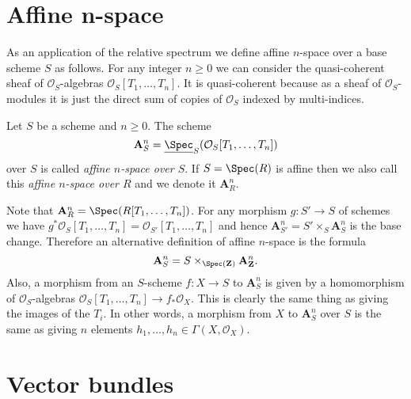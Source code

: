 \section{Affine n-space}
\label{section-affine-n-space}

\noindent
As an application of the relative spectrum
we define affine $n$-space over a base scheme
$S$ as follows. For any integer $n \geq 0$ we can consider the
quasi-coherent sheaf of $\mathcal{O}_S$-algebras
$\mathcal{O}_S[T_1, \ldots, T_n]$. It is quasi-coherent because
as a sheaf of $\mathcal{O}_S$-modules it is just the direct sum
of copies of $\mathcal{O}_S$ indexed by multi-indices.

\begin{definition}
\label{definition-affine-n-space}
Let $S$ be a scheme and $n \geq 0$.
The scheme
$$
\mathbf{A}^n_S =
\underline{\Spec}_S(\mathcal{O}_S[T_1, \ldots, T_n])
$$
over $S$ is called {\it affine $n$-space over $S$}.
If $S = \Spec(R)$ is affine then we also call this
{\it affine $n$-space over $R$} and we denote it $\mathbf{A}^n_R$.
\end{definition}

\noindent
Note that $\mathbf{A}^n_R = \Spec(R[T_1, \ldots, T_n])$.
For any morphism $g : S' \to S$ of schemes we have
$g^*\mathcal{O}_S[T_1, \ldots, T_n] = \mathcal{O}_{S'}[T_1, \ldots, T_n]$
and hence $\mathbf{A}^n_{S'} = S' \times_S \mathbf{A}^n_S$ is the base
change. Therefore an alternative definition of affine $n$-space
is the formula
$$
\mathbf{A}^n_S = S \times_{\Spec(\mathbf{Z})} \mathbf{A}^n_{\mathbf{Z}}.
$$
Also, a morphism from an $S$-scheme $f : X \to S$
to $\mathbf{A}^n_S$ is given by a homomorphism of
$\mathcal{O}_S$-algebras
$\mathcal{O}_S[T_1, \ldots, T_n] \to f_*\mathcal{O}_X$.
This is clearly the same thing as giving the images of the $T_i$.
In other words, a morphism from $X$ to $\mathbf{A}^n_S$ over $S$
is the same as giving $n$ elements
$h_1, \ldots, h_n \in \Gamma(X, \mathcal{O}_X)$.

















\section{Vector bundles}
\label{section-vector-bundle}

